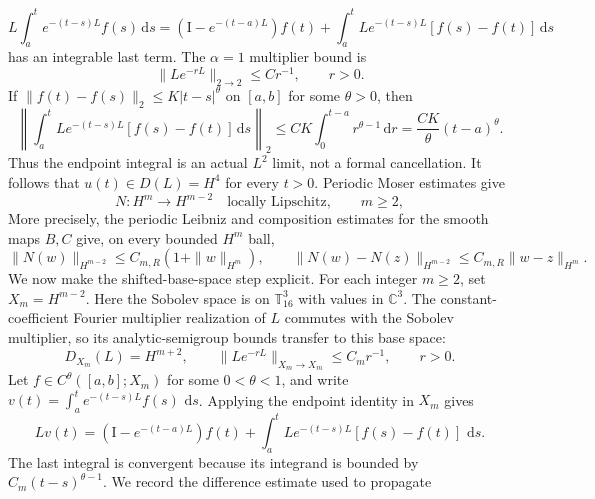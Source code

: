 \documentclass[11pt]{article}
\numberwithin{equation}{section}
\theoremstyle{definition}
\newcommand{\T}{\mathbb T}
\newcommand{\C}{\mathbb C}
\newcommand{\Id}{\mathrm I}
\newcommand{\dd}{\,\mathrm d}
\begin{document}
\begin{equation}
 L\int_a^t e^{-(t-s)L}f(s)\dd s
 =(\Id-e^{-(t-a)L})f(t)
 +\int_a^tLe^{-(t-s)L}[f(s)-f(t)]\dd s
 \label{eq:endpoint-cancellation}
\end{equation}
has an integrable last term.  The $\alpha=1$ multiplier bound is
\begin{equation}
 \|Le^{-rL}\|_{2\to2}\le C r^{-1},\qquad r>0.
 \label{eq:semigroup-first-order}
\end{equation}
If
$\|f(t)-f(s)\|_2\le K|t-s|^\theta$ on $[a,b]$ for some $\theta>0$, then
\begin{equation}
 \left\|\int_a^tLe^{-(t-s)L}[f(s)-f(t)]\dd s\right\|_2
 \le CK\int_0^{t-a}r^{\theta-1}\dd r
 =\frac{CK}{\theta}(t-a)^\theta.
 \label{eq:endpoint-integrability}
\end{equation}
Thus the endpoint integral is an actual $L^2$ limit, not a formal
cancellation.  It follows that $u(t)\in D(L)=H^4$ for every
$t>0$.  Periodic Moser estimates give
\begin{equation}
 N:H^m\longrightarrow H^{m-2}\quad\text{locally Lipschitz},\qquad m\ge2,
 \label{eq:moser}
\end{equation}
More precisely, the periodic Leibniz and composition estimates for the smooth
maps $B,C$ give, on every bounded $H^m$ ball,
\begin{equation}
 \|N(w)\|_{H^{m-2}}\le C_{m,R}(1+\|w\|_{H^m}),\qquad
 \|N(w)-N(z)\|_{H^{m-2}}
 \le C_{m,R}\|w-z\|_{H^m}.
 \label{eq:moser-tame}
\end{equation}
We now make the shifted-base-space step explicit.  For each integer
$m\ge2$, set $X_m=H^{m-2}$.  Here the Sobolev space is on $\T^3_{16}$ with
values in $\C^3$.  The constant-coefficient Fourier multiplier realization of
$L$ commutes with the Sobolev multiplier, so its analytic-semigroup bounds
transfer to this base space:
\begin{equation}
 D_{X_m}(L)=H^{m+2},\qquad
 \|Le^{-rL}\|_{X_m\to X_m}\le C_m r^{-1},\qquad r>0.
 \label{eq:shifted-base-semigroup}
\end{equation}
Let $f\in C^\theta([a,b];X_m)$ for some $0<\theta<1$, and write
$v(t)=\int_a^t e^{-(t-s)L}f(s)\,\dd s$.  Applying the endpoint identity in
$X_m$ gives
\begin{equation}
 Lv(t)=(\Id-e^{-(t-a)L})f(t)
 +\int_a^tLe^{-(t-s)L}[f(s)-f(t)]\,\dd s.
 \label{eq:shifted-base-cancellation}
\end{equation}
The last integral is convergent because its integrand is bounded by
$C_m(t-s)^{\theta-1}$.  We record the difference estimate used to propagate
\end{document}
